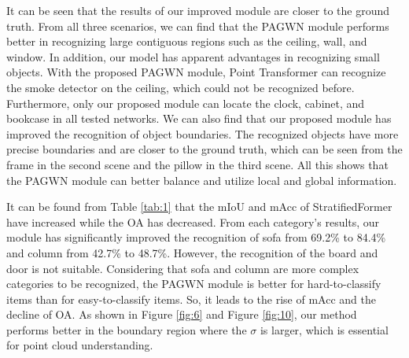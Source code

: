\documentclass[10pt,twocolumn,letterpaper]{article}
\begin{document}
        It can be seen that the results of our improved module are closer to the ground truth.
        From all three scenarios, we can find that the PAGWN module performs better in recognizing large contiguous regions such as the ceiling, wall, and window.
        In addition, our model has apparent advantages in recognizing small objects.
        With the proposed PAGWN module, Point Transformer can recognize the smoke detector on the ceiling, which could not be recognized before.
        Furthermore, only our proposed module can locate the clock, cabinet, and bookcase in all tested networks.
        We can also find that our proposed module has improved the recognition of object boundaries.
        The recognized objects have more precise boundaries and are closer to the ground truth, which can be seen from the frame in the second scene and the pillow in the third scene.
        All this shows that the PAGWN module can better balance and utilize local and global information.

        It can be found from Table \ref{tab:1} that the mIoU and mAcc of StratifiedFormer have increased while the OA has decreased.
        From each category's results, our module has significantly improved the recognition of sofa from 69.2\% to 84.4\% and column from 42.7\% to 48.7\%.
        However, the recognition of the board and door is not suitable.
        Considering that sofa and column are more complex categories to be recognized, the PAGWN module is better for hard-to-classify items than for easy-to-classify items.
        So, it leads to the rise of mAcc and the decline of OA.
        As shown in Figure \ref{fig:6} and Figure \ref{fig:10}, our method performs better in the boundary region where the $\sigma$ is larger, which is essential for point cloud understanding.
\end{document}
